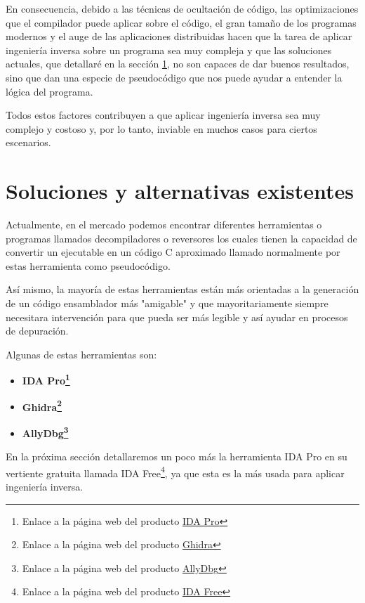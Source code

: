 En consecuencia, debido a las técnicas de ocultación de código, las optimizaciones que el compilador
puede aplicar sobre el código, el gran tamaño de los programas modernos y el auge de las aplicaciones
distribuidas hacen que la tarea de aplicar ingeniería inversa sobre un programa sea muy compleja y
que las soluciones actuales, que detallaré en la sección \ref{sec:alternativas}, no son capaces de dar
buenos resultados, sino que dan una especie de pseudocódigo que nos puede ayudar a entender la lógica
del programa.

Todos estos factores contribuyen a que aplicar ingeniería inversa sea muy complejo y costoso y, por
lo tanto, inviable en muchos casos para ciertos escenarios.

\section{Soluciones y alternativas existentes}
\label{sec:alternativas}


Actualmente, en el mercado podemos encontrar diferentes herramientas o programas llamados
decompiladores o reversores los cuales tienen la capacidad de convertir un ejecutable
en un código C aproximado llamado normalmente por estas herramienta como pseudocódigo.

Así mismo, la mayoría de estas herramientas están más orientadas a la generación de un
código ensamblador más "amigable" y que mayoritariamente siempre necesitara intervención
para que pueda ser más legible y así ayudar en procesos de depuración.

Algunas de estas herramientas son:

\begin{itemize}
    \item \bf IDA Pro\footnote{Enlace a la página web del producto \href{https://hex-rays.com/ida-pro/}{IDA Pro}}
    \item \bf Ghidra\footnote{Enlace a la página web del producto \href{https://ghidra-sre.org/}{Ghidra}}
    \item \bf AllyDbg\footnote{Enlace a la página web del producto \href{https://www.ollydbg.de/}{AllyDbg}}
\end{itemize}

En la próxima sección detallaremos un poco más la herramienta IDA Pro en su vertiente
gratuita llamada IDA Free\footnote{Enlace a la página web del producto \href{https://hex-rays.com/ida-free/}{IDA Free}},
ya que esta es la más usada para aplicar ingeniería inversa.

